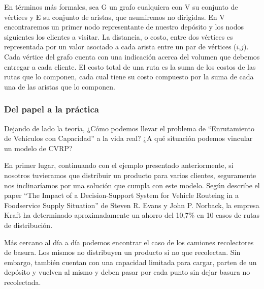 En términos más formales, sea G un grafo cualquiera con V su conjunto de vértices y E su conjunto de aristas, que asumiremos no dirigidas. En V encontraremos un primer nodo representante de nuestro depósito y los nodos siguientes los clientes a visitar. La distancia, o costo, entre dos vértices es representada por un valor asociado a cada arista entre un par de vértices ($i$,$j$). Cada vértice del grafo cuenta con una indicación acerca del volumen que debemos entregar a cada cliente. El costo total de una ruta es la suma de los costos de las rutas que lo componen, cada cual tiene su costo compuesto por la suma de cada una de las aristas que lo componen.

\subsubsection{Del papel a la práctica}
Dejando de lado la teoría, ¿Cómo podemos llevar el problema de ``Enrutamiento de Vehículos con Capacidad'' a la vida real? ¿A qué situación podemos vincular un modelo de CVRP?

\vskip 8pt

En primer lugar, continuando con el ejemplo presentado anteriormente, si nosotros tuvieramos que distribuir un producto para varios clientes, seguramente nos inclinaríamos por una solución que cumpla con este modelo. Según describe el paper ``The Impact of a Decision-Support System for Vehicle Routeing in a Foodservice Supply Situation'' de Steven R. Evans y John P. Norback, la empresa Kraft ha determinado aproximadamente un ahorro del 10,7\% en 10 casos de rutas de distribución.

\vskip 8pt

Más cercano al día a día podemos encontrar el caso de los camiones recolectores de basura. Los mismos no distribuyen un producto si no que recolectan. Sin embargo, también cuentan con una capacidad limitada para cargar, parten de un depósito y vuelven al mismo y deben pasar por cada punto sin dejar basura no recolectada.
